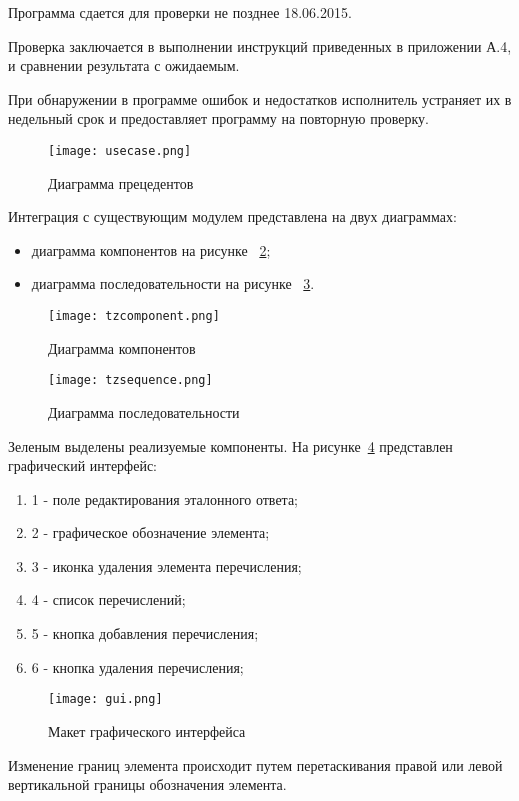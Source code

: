 \documentclass[a4paper,english]{G2-105}
\begin{document}
\par Программа сдается для проверки не позднее 18.06.2015.
\par Проверка заключается в выполнении инструкций приведенных в приложении А.4, и сравнении результата с ожидаемым.
\par При обнаружении в программе ошибок и недостатков исполнитель устраняет их в недельный срок и предоставляет программу на повторную проверку.

\begin{figure} 
\texttt{[image: usecase.png]}
\caption{Диаграмма прецедентов}\label{use-case}
\end{figure}

\newpage
\par Интеграция с существующим модулем представлена на двух диаграммах:
\begin{itemize}
    \item диаграмма компонентов на рисунке ~\ref{component};
    \item диаграмма последовательности на рисунке ~\ref{sequence}.
\end{itemize}
\begin{figure} 
\texttt{[image: tzcomponent.png]}
\caption{Диаграмма компонентов}\label{component}
\end{figure}
\newpage
\begin{figure} 
\texttt{[image: tzsequence.png]}
\caption{Диаграмма последовательности}\label{sequence}
\end{figure}
\par Зеленым выделены реализуемые компоненты.
На рисунке~\ref{gui} представлен графический интерфейс:
\begin{enumerate}
    \item 1 - поле редактирования эталонного ответа; 
    \item 2 - графическое обозначение элемента;
    \item 3 - иконка удаления элемента перечисления;
    \item 4 - список перечислений;
    \item 5 - кнопка добавления перечисления;
    \item 6 - кнопка удаления перечисления;
\end{enumerate}
\begin{figure} 
\texttt{[image: gui.png]}
\caption{Макет графического интерфейса}\label{gui}
\end{figure}
\par Изменение границ элемента происходит путем перетаскивания правой или левой вертикальной границы обозначения элемента.
\end{document}
